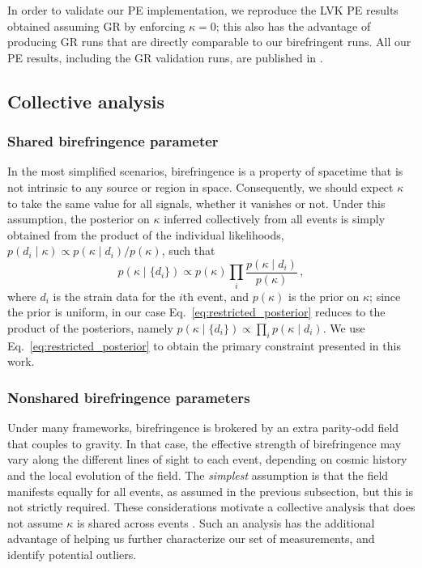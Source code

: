 \documentclass[aps,prd,twocolumn,superscriptaddress,preprintnumbers,nofootinbib]{revtex4-2}
\begin{document}
In order to validate our \ac{PE} implementation, we reproduce the \ac{LVK} \ac{PE} results obtained assuming \ac{GR} by enforcing $\kappa = 0$; this also has the advantage of producing \ac{GR} runs that are directly comparable to our birefringent runs.
All our \ac{PE} results, including the \ac{GR} validation runs, are published in \citet{dataset}.

\subsection{Collective analysis}

\subsubsection{Shared birefringence parameter}

In the most simplified scenarios, birefringence is a property of spacetime that is not intrinsic to any source or region in space. 
Consequently, we should expect $\kappa$ to take the same value for all signals, whether it vanishes or not.
Under this assumption, the posterior on $\kappa$ inferred collectively from all events is simply obtained from the product of the individual likelihoods, $p(d_i \mid\kappa) \propto p(\kappa \mid d_i)/p(\kappa)$, such that
\begin{equation}
    p(\kappa \mid \{d_i\})\propto p(\kappa) \prod_{i}\frac{p(\kappa \mid d_i)}{p(\kappa)}\,,
    \label{eq:restricted_posterior}
\end{equation}
where $d_i$ is the strain data for the $i$th event, and $p(\kappa)$ is the prior on $\kappa$; since the prior is uniform, in our case Eq.~\eqref{eq:restricted_posterior} reduces to the product of the posteriors, namely $p(\kappa \mid \{d_i\}) \propto \prod_{i}p(\kappa \mid d_i)$.
We use Eq.~\eqref{eq:restricted_posterior} to obtain the primary constraint presented in this work.

\subsubsection{Nonshared birefringence parameters}
\label{sec:method:hier}

Under many frameworks, birefringence is brokered by an extra parity-odd field that couples to gravity.
In that case, the effective strength of birefringence may vary along the different lines of sight to each event, depending on cosmic history and the local evolution of the field.
The \emph{simplest} assumption is that the field manifests equally for all events, as assumed in the previous subsection, but this is not strictly required.
These considerations motivate a collective analysis that does not assume $\kappa$ is shared across events \cite{Zimmerman:2019wzo,Isi:2022cii}.
Such an analysis has the additional advantage of helping us further characterize our set of measurements, and identify potential outliers.
\end{document}
